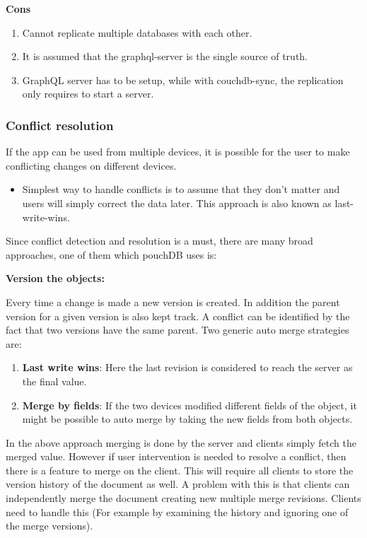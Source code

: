 \textbf{Cons}
\begin{enumerate}
    \item Cannot replicate multiple databases with each other.
    \item It is assumed that the graphql-server is the single source of truth.
    \item GraphQL server has to be setup, while with couchdb-sync, the replication 
    only requires to start a server.~\cite{RxDBreplication}
\end{enumerate}


\subsubsection{Conflict resolution}
If the app can be used from multiple devices, it is possible for the user to make 
conflicting changes on different devices.

\begin{itemize}
    \item Simplest way to handle conflicts is to assume that they don’t matter and 
    users will simply correct the data later. This approach is also known as last-write-wins.
\end{itemize}

Since conflict detection and resolution is a must, there are many broad approaches, 
one of them which pouchDB uses is:

\textbf{Version the objects:}

Every time a change is made a new version is created. In addition the parent version for a given 
version is also kept track. A conflict can be identified by the fact that two versions have the 
same parent. Two generic auto merge strategies are:

\begin{enumerate}
    \item \textbf{Last write wins}: Here the last revision is considered to 
    reach the server as the final value.
    \item \textbf{Merge by fields}: If the two devices modified different fields 
    of the object, it might be possible to auto merge by taking the new fields from both objects.
\end{enumerate}

In the above approach merging is done by the server and clients simply fetch the merged value. 
However if user intervention is needed to resolve a conflict, then there is a feature to merge on the client.
This will require all clients to store the version history of the document as well. A problem with this 
is that clients can independently merge the document creating new multiple merge revisions.
Clients need to handle this (For example by examining the history and ignoring one of the merge versions).

